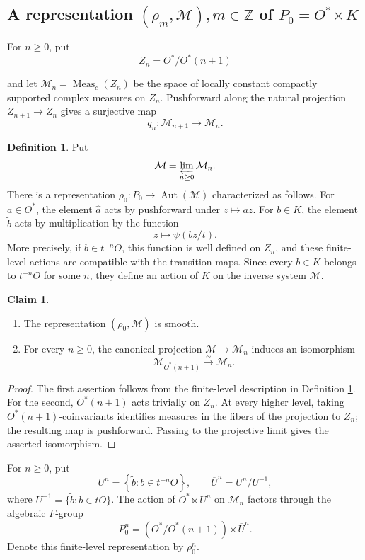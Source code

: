 \documentclass[11pt,a4paper,twoside]{amsart}
\theoremstyle{definition}
\newtheorem{definition}[theorem]{Definition}
\newtheorem{claim}[theorem]{Claim}
\theoremstyle{remark}
\newcommand{\mZ}{\mathbb Z}
\newcommand{\mcM}{\mathcal M}
\newcommand{\Aut}{\operatorname{Aut}}
\begin{document}
\subsection{A representation $(\rho_m,\mcM),m\in \mZ$ of $P_0=O^*\ltimes K$}
For $n\geq0$, put
$$
Z_n=O^*/O^*(n+1)
$$

and let $\mcM_n=\operatorname{Meas}_c(Z_n)$ be the space of locally constant compactly supported complex measures on $Z_n$. Pushforward along the natural projection $Z_{n+1}\to Z_n$ gives a surjective map
$$
q_n:\mcM_{n+1}\longrightarrow\mcM_n.
$$
\begin{definition}\label{M-definition}
Put
$$
\mcM=\varprojlim_{n\geq0}\mcM_n.
$$
There is a representation $\rho_0:P_0\to\Aut(\mcM)$ characterized as follows. For $a\in O^*$, the element $\widehat a$ acts by pushforward under $z\mapsto az$. For $b\in K$, the element $\widetilde b$ acts by multiplication by the function
$$
z\longmapsto\psi(bz/t).
$$
More precisely, if $b\in t^{-n}O$, this function is well defined on $Z_n$, and these finite-level actions are compatible with the transition maps. Since every $b\in K$ belongs to $t^{-n}O$ for some $n$, they define an action of $K$ on the inverse system $\mcM$.
\end{definition}
\begin{claim}\label{M-smooth-coinvariants}
\begin{enumerate}
\item The representation $(\rho_0,\mcM)$ is smooth.
\item For every $n\geq0$, the canonical projection $\mcM\to\mcM_n$ induces an isomorphism
$$
\mcM_{O^*(n+1)}\stackrel{\sim}{\longrightarrow}\mcM_n.
$$
\end{enumerate}
\end{claim}
\begin{proof}
The first assertion follows from the finite-level description in Definition \ref{M-definition}. For the second, $O^*(n+1)$ acts trivially on $Z_n$. At every higher level, taking $O^*(n+1)$-coinvariants identifies measures in the fibers of the projection to $Z_n$; the resulting map is pushforward. Passing to the projective limit gives the asserted isomorphism.
\end{proof}
For $n\geq0$, put
$$
U^n=\left\{\widetilde b:b\in t^{-n}O\right\},\qquad \overline U^n=U^n/U^{-1},
$$
where $U^{-1}=\{\widetilde b:b\in tO\}$. The action of $O^*\ltimes U^n$ on $\mcM_n$ factors through the algebraic $F$-group
$$
P_0^n=(O^*/O^*(n+1))\ltimes\overline U^n.
$$
Denote this finite-level representation by $\rho_0^n$.
\end{document}
